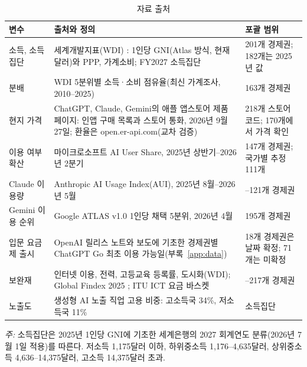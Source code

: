 \documentclass[11pt]{article}
\theoremstyle{definition}
\theoremstyle{remark}
\begin{document}
\begin{table}[t]
\centering
\begin{threeparttable}
\caption{자료 출처}\label{tab:data}
\small
\begin{tabularx}{\textwidth}{@{}>{\raggedright\arraybackslash}p{3.0cm}>{\raggedright\arraybackslash}X>{\raggedright\arraybackslash}p{3.2cm}@{}}
\toprule
변수 & 출처와 정의 & 포괄 범위 \\
\midrule
소득, 소득집단 & 세계개발지표(WDI) \citep{worldbank2026wdi}: 1인당 GNI(Atlas 방식, 현재 달러)와 PPP, 가계소비; FY2027 소득집단 \citep{worldbank2026class} & 201개 경제권; 182개는 2025년 값 \\
분배 & WDI 5분위별 소득·소비 점유율(최신 가계조사, 2010--2025) & 163개 경제권 \\
현지 가격 & ChatGPT, Claude, Gemini의 애플 앱스토어 제품 페이지: 인앱 구매 목록과 스토어 통화, 2026년 9월 27일; 환율은 open.er-api.com(교차 검증) & 218개 스토어 코드; 170개에서 가격 확인 \\
이용 여부 확산 & 마이크로소프트 AI User Share, 2025년 상반기--2026년 2분기 \citep{misra2025measuring,microsoft2026q2} & 147개 경제권; 국가별 추정 111개 \\
Claude 이용량 & Anthropic AI Usage Index(AUI), 2025년 8월--2026년 5월 \citep{anthropic2026aei} & 114--121개 경제권 \\
Gemini 이용 순위 & Google ATLAS v1.0 1인당 채택 5분위, 2026년 4월 \citep{iscenko2026atlas} & 195개 경제권 \\
입문 요금제 출시 & OpenAI 릴리스 노트와 보도에 기초한 경제권별 ChatGPT Go 최초 이용 가능일(부록~\ref{app:data}) & 18개 경제권은 날짜 확정; 71개는 미확정 \\
보완재 & 인터넷 이용, 전력, 고등교육 등록률, 도시화(WDI); Global Findex 2025 \citep{klapper2025findex}; ITU ICT 요금 바스켓 \citep{itu2025baskets} & 142--217개 경제권 \\
노출도 & 생성형 AI 노출 직업 고용 비중: 고소득국 34\%, 저소득국 11\% \citep{gmyrek2025generative} & 소득집단 \\
\bottomrule
\end{tabularx}
\begin{tablenotes}[flushleft]\footnotesize
\item \emph{주:} 소득집단은 2025년 1인당 GNI에 기초한 세계은행의 2027 회계연도 분류(2026년 7월 1일 적용)를 따른다. 저소득 1,175달러 이하, 하위중소득 1,176--4,635달러, 상위중소득 4,636--14,375달러, 고소득 14,375달러 초과.
\end{tablenotes}
\end{threeparttable}
\end{table}
\end{document}
